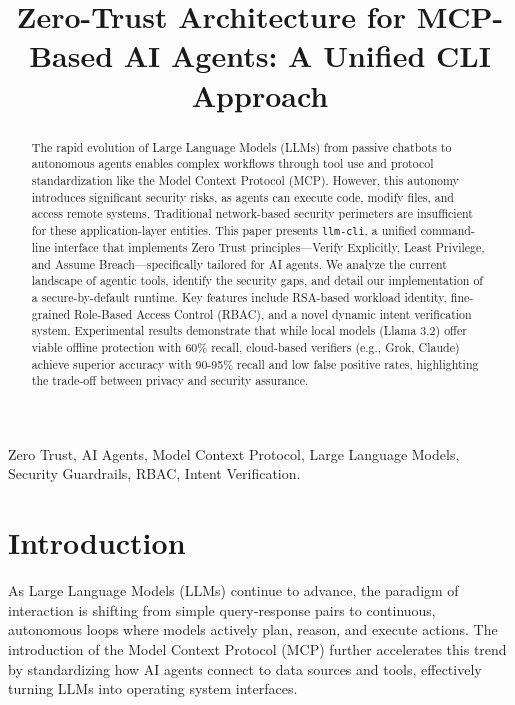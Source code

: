 \documentclass[conference]{IEEEtran}
\begin{document}
\title{Zero-Trust Architecture for MCP-Based AI Agents: A Unified CLI Approach}

\author{
}

\maketitle

\begin{abstract}
The rapid evolution of Large Language Models (LLMs) from passive chatbots to autonomous agents enables complex workflows through tool use and protocol standardization like the Model Context Protocol (MCP). However, this autonomy introduces significant security risks, as agents can execute code, modify files, and access remote systems. Traditional network-based security perimeters are insufficient for these application-layer entities. This paper presents \texttt{llm-cli}, a unified command-line interface that implements Zero Trust principles---Verify Explicitly, Least Privilege, and Assume Breach---specifically tailored for AI agents. We analyze the current landscape of agentic tools, identify the security gaps, and detail our implementation of a secure-by-default runtime. Key features include RSA-based workload identity, fine-grained Role-Based Access Control (RBAC), and a novel dynamic intent verification system. Experimental results demonstrate that while local models (Llama 3.2) offer viable offline protection with 60\% recall, cloud-based verifiers (e.g., Grok, Claude) achieve superior accuracy with 90-95\% recall and low false positive rates, highlighting the trade-off between privacy and security assurance.
\end{abstract}

\begin{IEEEkeywords}
Zero Trust, AI Agents, Model Context Protocol, Large Language Models, Security Guardrails, RBAC, Intent Verification.
\end{IEEEkeywords}

\section{Introduction}
As Large Language Models (LLMs) continue to advance, the paradigm of interaction is shifting from simple query-response pairs to continuous, autonomous loops where models actively plan, reason, and execute actions. The introduction of the Model Context Protocol (MCP) \cite{mcp} further accelerates this trend by standardizing how AI agents connect to data sources and tools, effectively turning LLMs into operating system interfaces.
\end{document}
